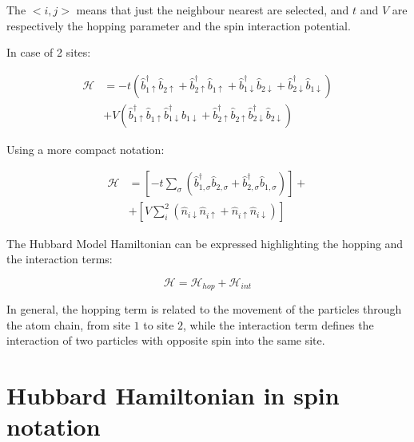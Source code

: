 \documentclass[twoside,twocolumn]{article}
\begin{document}
The $<i,j>$ means that just the neighbour nearest are selected, and $t$ and $V$ are respectively the hopping parameter and the spin interaction potential.

In case of 2 sites:

\begin{equation}
  \begin{aligned}
    \mathcal{H} & = -t (\hat{b}^{\dagger}_{1\uparrow}\hat{b}_{2\uparrow}+
    \hat{b}^{\dagger}_{2\uparrow}\hat{b}_{1\uparrow}+
    \hat{b}^{\dagger}_{1\downarrow}\hat{b}_{2\downarrow}+
    \hat{b}^{\dagger}_{2\downarrow}\hat{b}_{1\downarrow}) \\
    & + V(\hat{b}^{\dagger}_{1\uparrow}\hat{b}_{1\uparrow}\hat{b}^{\dagger}_{1\downarrow}\hat{b}_{1\downarrow}+
    \hat{b}^{\dagger}_{2\uparrow}\hat{b}_{2\uparrow}\hat{b}^{\dagger}_{2\downarrow}\hat{b}_{2\downarrow})
    \end{aligned}
  \end{equation}

Using a more compact notation:

\begin{equation}\label{eq:hamiltonian1}
\begin{aligned}
\mathcal{H} &= [-t \sum_\sigma (\hat{b}^{\dagger}_{1,\sigma}\hat{b}_{2,\sigma}+\hat{b}^{\dagger}_{2,\sigma}\hat{b}_{1,\sigma})]+\\
&+ [V \sum_i^2(\hat{n}_{i\downarrow}\hat{n}_{i\uparrow} + \hat{n}_{i\uparrow}\hat{n}_{i\downarrow})]
\end{aligned}
\end{equation}


The Hubbard Model Hamiltonian can be expressed highlighting the hopping and the interaction terms:

\begin{equation}
\mathcal{H} = \mathcal{H}_{hop} + \mathcal{H}_{int}
\end{equation}

In general, the hopping term is related to the movement of the particles through the atom chain, from site $1$ to site $2$,
while the interaction term defines the interaction of two particles with opposite spin into the same site.


\section{Hubbard Hamiltonian in spin notation}
\end{document}
